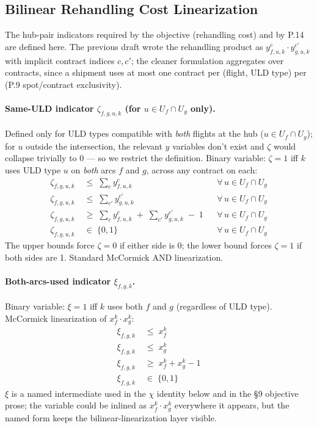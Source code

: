 \documentclass[11pt,a4paper]{article}
\theoremstyle{definition}
\begin{document}
\subsection{Bilinear Rehandling Cost Linearization}
\label{sec:lin-rehandling}

The hub-pair indicators required by the objective (rehandling cost) and by P.14 are
defined here. The previous draft wrote the rehandling product as
$y_{f,u,k}^c \cdot y_{g,u,k}^{c'}$ with implicit contract indices $c, c'$; the
cleaner formulation aggregates over contracts, since a shipment uses at most one
contract per (flight, ULD type) per (P.9 spot/contract exclusivity).

\paragraph{Same-ULD indicator $\zeta_{f,g,u,k}$ (for $u \in U_f \cap U_g$ only).}
Defined only for ULD types compatible with \emph{both} flights at the hub
($u \in U_f \cap U_g$); for $u$ outside the intersection, the relevant $y$
variables don't exist and $\zeta$ would collapse trivially to 0 --- so we restrict
the definition. Binary variable: $\zeta = 1$ iff $k$ uses ULD type $u$ on
\emph{both} arcs $f$ and $g$, across any contract on each:
\begin{align}
  \zeta_{f,g,u,k} \;&\leq\; \sum_{c} y_{f,u,k}^{c} & & \forall\, u \in U_f \cap U_g \\
  \zeta_{f,g,u,k} \;&\leq\; \sum_{c'} y_{g,u,k}^{c'} & & \forall\, u \in U_f \cap U_g \\
  \zeta_{f,g,u,k} \;&\geq\; \sum_{c} y_{f,u,k}^{c} \;+\; \sum_{c'} y_{g,u,k}^{c'} \;-\; 1 & & \forall\, u \in U_f \cap U_g \\
  \zeta_{f,g,u,k} \;&\in\; \{0, 1\} & & \forall\, u \in U_f \cap U_g
\end{align}
The upper bounds force $\zeta = 0$ if either side is 0; the lower bound forces
$\zeta = 1$ if both sides are 1. Standard McCormick AND linearization.

\paragraph{Both-arcs-used indicator $\xi_{f,g,k}$.}
Binary variable: $\xi = 1$ iff $k$ uses both $f$ and $g$ (regardless of ULD type).
McCormick linearization of $x_f^k \cdot x_g^k$:
\begin{align}
  \xi_{f,g,k} \;&\leq\; x_f^k \\
  \xi_{f,g,k} \;&\leq\; x_g^k \\
  \xi_{f,g,k} \;&\geq\; x_f^k + x_g^k - 1 \\
  \xi_{f,g,k} \;&\in\; \{0, 1\}
\end{align}
$\xi$ is a named intermediate used in the $\chi$ identity below and in the §9
objective prose; the variable could be inlined as $x_f^k \cdot x_g^k$ everywhere it
appears, but the named form keeps the bilinear-linearization layer visible.
\end{document}
